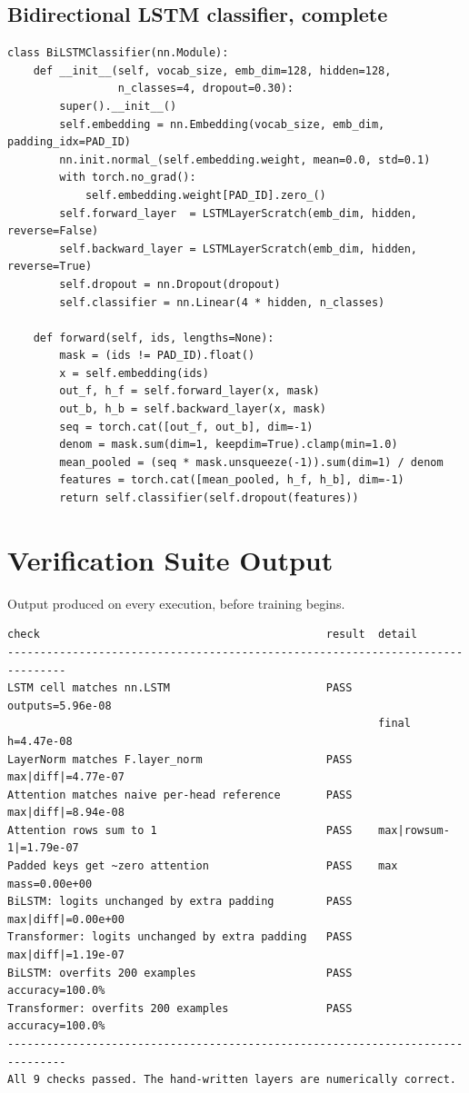 \section{Bidirectional LSTM classifier, complete}

{\small
\begin{verbatim}
class BiLSTMClassifier(nn.Module):
    def __init__(self, vocab_size, emb_dim=128, hidden=128,
                 n_classes=4, dropout=0.30):
        super().__init__()
        self.embedding = nn.Embedding(vocab_size, emb_dim, padding_idx=PAD_ID)
        nn.init.normal_(self.embedding.weight, mean=0.0, std=0.1)
        with torch.no_grad():
            self.embedding.weight[PAD_ID].zero_()
        self.forward_layer  = LSTMLayerScratch(emb_dim, hidden, reverse=False)
        self.backward_layer = LSTMLayerScratch(emb_dim, hidden, reverse=True)
        self.dropout = nn.Dropout(dropout)
        self.classifier = nn.Linear(4 * hidden, n_classes)

    def forward(self, ids, lengths=None):
        mask = (ids != PAD_ID).float()
        x = self.embedding(ids)
        out_f, h_f = self.forward_layer(x, mask)
        out_b, h_b = self.backward_layer(x, mask)
        seq = torch.cat([out_f, out_b], dim=-1)
        denom = mask.sum(dim=1, keepdim=True).clamp(min=1.0)
        mean_pooled = (seq * mask.unsqueeze(-1)).sum(dim=1) / denom
        features = torch.cat([mean_pooled, h_f, h_b], dim=-1)
        return self.classifier(self.dropout(features))
\end{verbatim}}

\chapter{Verification Suite Output}
\label{app:verification}

Output produced on every execution, before training begins.

{\small
\begin{verbatim}
check                                            result  detail
-------------------------------------------------------------------------------
LSTM cell matches nn.LSTM                        PASS    outputs=5.96e-08
                                                         final h=4.47e-08
LayerNorm matches F.layer_norm                   PASS    max|diff|=4.77e-07
Attention matches naive per-head reference       PASS    max|diff|=8.94e-08
Attention rows sum to 1                          PASS    max|rowsum-1|=1.79e-07
Padded keys get ~zero attention                  PASS    max mass=0.00e+00
BiLSTM: logits unchanged by extra padding        PASS    max|diff|=0.00e+00
Transformer: logits unchanged by extra padding   PASS    max|diff|=1.19e-07
BiLSTM: overfits 200 examples                    PASS    accuracy=100.0%
Transformer: overfits 200 examples               PASS    accuracy=100.0%
-------------------------------------------------------------------------------
All 9 checks passed. The hand-written layers are numerically correct.
\end{verbatim}}

